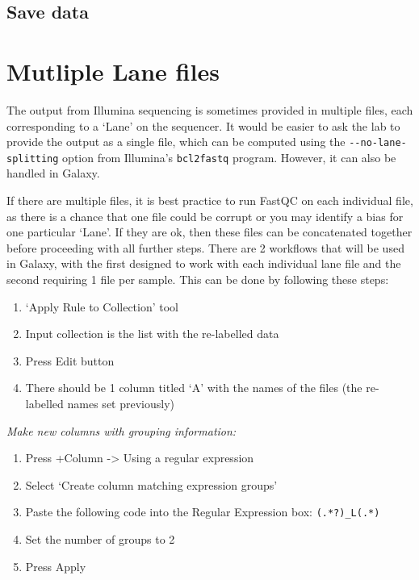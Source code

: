 \documentclass[
]{book}
\providecommand{\tightlist}{%
  \setlength{\itemsep}{0pt}\setlength{\parskip}{0pt}}
\begin{document}
\hypertarget{save-data}{%
\section{Save data}\label{save-data}}

\hypertarget{multiple-lane-files}{%
\chapter{Mutliple Lane files}\label{multiple-lane-files}}

The output from Illumina sequencing is sometimes provided in multiple files, each corresponding to a `Lane' on the sequencer. It would be easier to ask the lab to provide the output as a single file, which can be computed using the \texttt{-\/-no-lane-splitting} option from Illumina's \texttt{bcl2fastq} program. However, it can also be handled in Galaxy.

If there are multiple files, it is best practice to run FastQC on each individual file, as there is a chance that one file could be corrupt or you may identify a bias for one particular `Lane'. If they are ok, then these files can be concatenated together before proceeding with all further steps. There are 2 workflows that will be used in Galaxy, with the first designed to work with each individual lane file and the second requiring 1 file per sample. This can be done by following these steps:

\begin{enumerate}
\def\labelenumi{\arabic{enumi}.}
\tightlist
\item
  `Apply Rule to Collection' tool
\item
  Input collection is the list with the re-labelled data
\item
  Press Edit button
\item
  There should be 1 column titled `A' with the names of the files (the re-labelled names set previously)
\end{enumerate}

\emph{Make new columns with grouping information:}

\begin{enumerate}
\def\labelenumi{\arabic{enumi}.}
\setcounter{enumi}{4}
\tightlist
\item
  Press +Column -\textgreater{} Using a regular expression
\item
  Select `Create column matching expression groups'
\item
  Paste the following code into the Regular Expression box: \texttt{(.*?)\_L(.*)}
\item
  Set the number of groups to 2
\item
  Press Apply
\end{enumerate}
\end{document}
